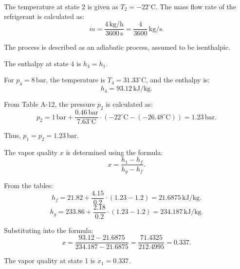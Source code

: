 The temperature at state 2 is given as \( T_2 = -22^\circ\text{C} \). The mass flow rate of the refrigerant is calculated as:  
\[
\dot{m} = \frac{4 \, \text{kg/h}}{3600 \, \text{s}} = \frac{4}{3600} \, \text{kg/s}.
\]

The process is described as an adiabatic process, assumed to be isenthalpic.  

The enthalpy at state 4 is \( h_4 = h_1 \).  

For \( p_4 = 8 \, \text{bar} \), the temperature is \( T_4 = 31.33^\circ\text{C} \), and the enthalpy is:  
\[
h_4 = 93.12 \, \text{kJ/kg}.
\]

From Table A-12, the pressure \( p_2 \) is calculated as:  
\[
p_2 = 1 \, \text{bar} + \frac{0.46 \, \text{bar}}{7.63^\circ\text{C}} \cdot (-22^\circ\text{C} - (-26.48^\circ\text{C})) = 1.23 \, \text{bar}.
\]

Thus, \( p_1 = p_2 = 1.23 \, \text{bar} \).  

The vapor quality \( x \) is determined using the formula:  
\[
x = \frac{h_1 - h_f}{h_g - h_f}.
\]

From the tables:  
\[
h_f = 21.82 + \frac{4.15}{0.2} \cdot (1.23 - 1.2) = 21.6875 \, \text{kJ/kg}.
\]  
\[
h_g = 233.86 + \frac{2.18}{0.2} \cdot (1.23 - 1.2) = 234.187 \, \text{kJ/kg}.
\]

Substituting into the formula:  
\[
x = \frac{93.12 - 21.6875}{234.187 - 21.6875} = \frac{71.4325}{212.4995} = 0.337.
\]  

The vapor quality at state 1 is \( x_1 = 0.337 \).